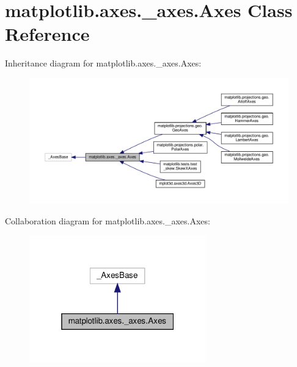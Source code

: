 \hypertarget{classmatplotlib_1_1axes_1_1__axes_1_1Axes}{}\section{matplotlib.\+axes.\+\_\+axes.\+Axes Class Reference}
\label{classmatplotlib_1_1axes_1_1__axes_1_1Axes}


Inheritance diagram for matplotlib.\+axes.\+\_\+axes.\+Axes\+:
\nopagebreak
\begin{figure}[H]
\begin{center}
\leavevmode
\includegraphics[width=350pt]{classmatplotlib_1_1axes_1_1__axes_1_1Axes__inherit__graph}
\end{center}
\end{figure}


Collaboration diagram for matplotlib.\+axes.\+\_\+axes.\+Axes\+:
\nopagebreak
\begin{figure}[H]
\begin{center}
\leavevmode
\includegraphics[width=217pt]{classmatplotlib_1_1axes_1_1__axes_1_1Axes__coll__graph}
\end{center}
\end{figure}
